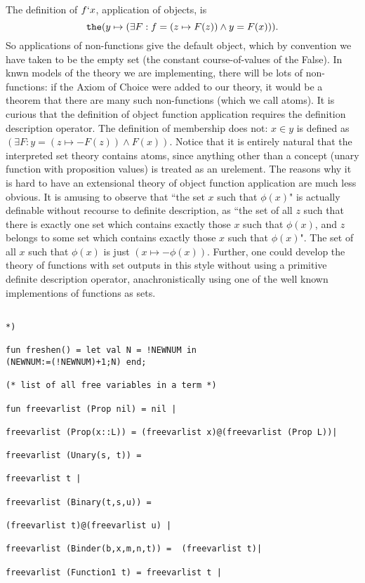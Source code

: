\documentclass{article}
\begin{document}
{{The definition of $f`x$, application of objects, is $${\tt the}(y \mapsto (\exists F: f = (z \mapsto F(z)) \wedge y=F(x))).$$ So applications of non-functions give the default object, which by convention we have taken to be
the empty set (the constant course-of-values of the False).  In knwn models of the theory we are implementing, there will be lots of non-functions:  if the Axiom of Choice were added to our theory, it would be a theorem that there are many such non-functions (which we call atoms).  It is  curious that the definition of object function application requires the definition description operator.  The definition of membership does not:
$x \in y$ is defined as $(\exists F: y = (z \mapsto -F(z)) \wedge F(x))$.  Notice that it is entirely natural that the interpreted set theory contains atoms, since anything other than a concept (unary function with proposition values) is treated as an urelement.  The reasons why it is hard to have an extensional theory of object function application are much less obvious.  It is amusing to observe that ``the set $x$ such that $\phi(x)$" is actually definable without recourse to definite description, as ``the set of all $z$ such that there is exactly one set which contains exactly those $x$ such that $\phi(x)$, and $z$ belongs to some set which contains exactly those $x$ such that $\phi(x)$".  The set of all $x$ such that $\phi(x)$ is just
$(x \mapsto -\phi(x))$.  Further, one could develop the theory of functions with set outputs in this style without using a primitive definite description operator, anachronistically using one of the well known implementions of functions as sets.

\begin{verbatim}

*)

fun freshen() = let val N = !NEWNUM in 
(NEWNUM:=(!NEWNUM)+1;N) end;

(* list of all free variables in a term *)

fun freevarlist (Prop nil) = nil |

freevarlist (Prop(x::L)) = (freevarlist x)@(freevarlist (Prop L))|

freevarlist (Unary(s, t)) = 

freevarlist t |

freevarlist (Binary(t,s,u)) = 

(freevarlist t)@(freevarlist u) |

freevarlist (Binder(b,x,m,n,t)) =  (freevarlist t)|

freevarlist (Function1 t) = freevarlist t |


\end{verbatim}}}
\end{document}
